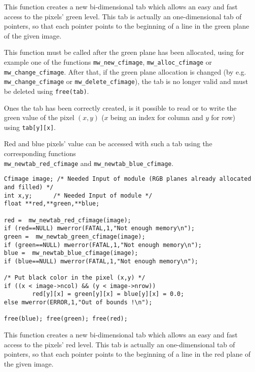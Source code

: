 \newpage %
\Description
This function creates a new bi-dimensional tab which allows an easy and fast
access to the pixels' green level.
This tab is actually an one-dimensional tab of pointers, so that each pointer 
points to the beginning of a line in the green plane of the given image.

This function must be called after the green plane has been allocated,
using for example one of the functions \verb+mw_new_cfimage+, 
\verb+mw_alloc_cfimage+ or \verb+mw_change_cfimage+. 
After that, if the green plane allocation is changed
(by e.g. \verb+mw_change_cfimage+ or \verb+mw_delete_cfimage+), the tab is
no longer valid and must be deleted using \verb+free(tab)+.

Ones the tab has been correctly created, is it possible to read or to
write the green value of the pixel $(x,y)$ ($x$ being an index for column and $y$
for row) using \verb+tab[y][x]+.

Red and blue pixels' value can be accessed with such a tab using 
the corresponding functions \\
\verb+mw_newtab_red_cfimage+ and \verb+mw_newtab_blue_cfimage+.

\Next
\Example
\begin{verbatim}
Cfimage image; /* Needed Input of module (RGB planes already allocated and filled) */
int x,y;      /* Needed Input of module */
float **red,**green,**blue;

red =  mw_newtab_red_cfimage(image);
if (red==NULL) mwerror(FATAL,1,"Not enough memory\n");
green =  mw_newtab_green_cfimage(image);
if (green==NULL) mwerror(FATAL,1,"Not enough memory\n");
blue =  mw_newtab_blue_cfimage(image);
if (blue==NULL) mwerror(FATAL,1,"Not enough memory\n");

/* Put black color in the pixel (x,y) */
if ((x < image->ncol) && (y < image->nrow)) 
        red[y][x] = green[y][x] = blue[y][x] = 0.0;
else mwerror(ERROR,1,"Out of bounds !\n");

free(blue); free(green); free(red);
\end{verbatim}

\newpage %
\Description
This function creates a new bi-dimensional tab which allows an easy and fast
access to the pixels' red level.
This tab is actually an one-dimensional tab of pointers, so that each pointer 
points to the beginning of a line in the red plane of the given image.

